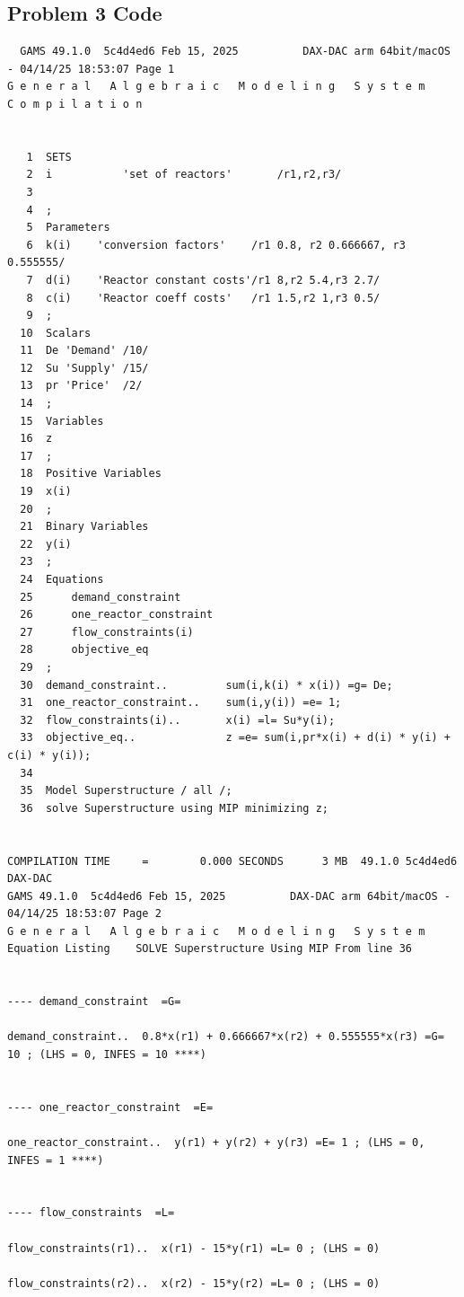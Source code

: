 \documentclass[11pt]{article}
\begin{document}
\subsection{Problem 3 Code}
\label{problem3code}
\begin{verbatim}
  GAMS 49.1.0  5c4d4ed6 Feb 15, 2025          DAX-DAC arm 64bit/macOS - 04/14/25 18:53:07 Page 1
G e n e r a l   A l g e b r a i c   M o d e l i n g   S y s t e m
C o m p i l a t i o n


   1  SETS
   2  i           'set of reactors'       /r1,r2,r3/
   3   
   4  ;
   5  Parameters
   6  k(i)    'conversion factors'    /r1 0.8, r2 0.666667, r3 0.555555/
   7  d(i)    'Reactor constant costs'/r1 8,r2 5.4,r3 2.7/
   8  c(i)    'Reactor coeff costs'   /r1 1.5,r2 1,r3 0.5/
   9  ;
  10  Scalars
  11  De 'Demand' /10/
  12  Su 'Supply' /15/
  13  pr 'Price'  /2/
  14  ;
  15  Variables
  16  z
  17  ;
  18  Positive Variables
  19  x(i)
  20  ;
  21  Binary Variables
  22  y(i)
  23  ;
  24  Equations
  25      demand_constraint
  26      one_reactor_constraint
  27      flow_constraints(i)
  28      objective_eq
  29  ;
  30  demand_constraint..         sum(i,k(i) * x(i)) =g= De;
  31  one_reactor_constraint..    sum(i,y(i)) =e= 1;
  32  flow_constraints(i)..       x(i) =l= Su*y(i);
  33  objective_eq..              z =e= sum(i,pr*x(i) + d(i) * y(i) + c(i) * y(i));
  34   
  35  Model Superstructure / all /;
  36  solve Superstructure using MIP minimizing z;


COMPILATION TIME     =        0.000 SECONDS      3 MB  49.1.0 5c4d4ed6 DAX-DAC
GAMS 49.1.0  5c4d4ed6 Feb 15, 2025          DAX-DAC arm 64bit/macOS - 04/14/25 18:53:07 Page 2
G e n e r a l   A l g e b r a i c   M o d e l i n g   S y s t e m
Equation Listing    SOLVE Superstructure Using MIP From line 36


---- demand_constraint  =G=  

demand_constraint..  0.8*x(r1) + 0.666667*x(r2) + 0.555555*x(r3) =G= 10 ; (LHS = 0, INFES = 10 ****)
     

---- one_reactor_constraint  =E=  

one_reactor_constraint..  y(r1) + y(r2) + y(r3) =E= 1 ; (LHS = 0, INFES = 1 ****)
     

---- flow_constraints  =L=  

flow_constraints(r1)..  x(r1) - 15*y(r1) =L= 0 ; (LHS = 0)
     
flow_constraints(r2)..  x(r2) - 15*y(r2) =L= 0 ; (LHS = 0)
     

\end{verbatim}
\end{document}
